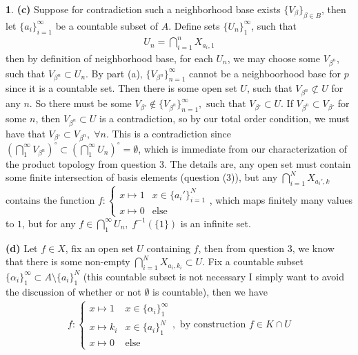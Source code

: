 \documentclass[10.5pt]{article}
\theoremstyle{definition}
\newtheorem{pb}{}
\newcommand{\set}[1]{\{#1\}}
\begin{document}
\begin{pb}
        \textbf{(c)} Suppose for contradiction such a neighborhood base exists \(\set{V_\beta}_{\beta \in B}\), then let \(\set{a_i}_{i=1}^\infty\) be a countable subset of \(A\). Define sets \(\set{U_n}_1^\infty\), such that
        \begin{align*}
            U_n = \bigcap_{i=1}^n X_{a_i,1}
        \end{align*}
        then by definition of neighborhood base, for each \(U_n\), we may choose some \(V_{\beta^n}\), such that \(V_{\beta^n} \subset U_n\). By part (a),
        \(\set{V_{\beta^n}}_{n=1}^\infty\) cannot be a neighboorhood base for \(p\) since it is a countable set. Then there is some open set \(U\), such that
        \(V_{\beta^n} \not \subset U\) for any \(n\). So there must be some \(V_{\beta'} \not \in \set{V_{\beta^n}}_{n=1}^\infty, \text{ such that } V_{\beta'} \subset U\). If \(V_{\beta^n} \subset V_{\beta'}\) for some \(n\), then \(V_{\beta^n} \subset U\) is a contradiction, so by our total order condition, we must have that \(V_{\beta'} \subset V_{\beta^n}, \; \forall n\). This is a contradiction since \(\left(\bigcap_1^\infty V_{\beta^n}\right)^\circ \subset \left(\bigcap_1^\infty U_n\right)^\circ = \emptyset\), which is immediate from our characterization of the product topology from question 3. The details are, any open set must contain some finite intersection of basis elements (question (3)), but any \(\bigcap_{i=1}^N X_{a_i',k}\) contains the function \(f: \begin{cases}
            x \mapsto 1 & x \in \set{a_i'}_{i=1}^N \\
            x \mapsto 0 & \text{else}
        \end{cases}\), which maps finitely many values to \(1\), but for any \(f \in \bigcap_1^\infty U_n, \; f^{-1}(\set{1})\) is an infinite set.

        \textbf{(d)} Let \(f \in X\), fix an open set \(U\) containing \(f\), then from question 3, we know that there is some non-empty \(\bigcap_{i=1}^N X_{a_i,k_i} \subset U\). Fix a countable subset \(\set{\alpha_i}_1^\infty \subset A \setminus \set{a_i}_1^N\) (this countable subset is not necessary I simply want to avoid the discussion of whether or not \(\emptyset\) is countable), then we have
        \begin{align*}
            f: \begin{cases}
                x \mapsto 1 & x \in \set{\alpha_i}_1^\infty \\
                x \mapsto k_i & x \in \set{a_i}_1^N \\
                x \mapsto 0 & \text{else}
            \end{cases}, \text{ by construction } f \in K\cap U
        \end{align*}


\end{pb}
\end{document}
